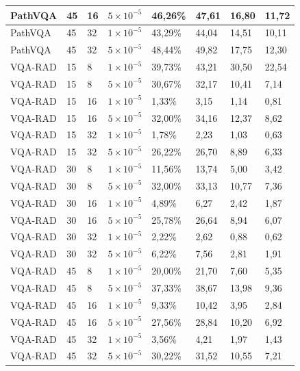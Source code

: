 \begin{longtable}[c]{|l|l|l|l|l|l|l|l|}
    PathVQA & 45 & 16 & $5 \times 10^{-5}$ & 46,26\% & 47,61 & 16,80 & 11,72 \\ \hline
    PathVQA & 45 & 32 & $1 \times 10^{-5}$ & 43,29\% & 44,04 & 14,51 & 10,11 \\ \hline
    PathVQA & 45 & 32 & $5 \times 10^{-5}$ & 48,44\% & 49,82 & 17,75 & 12,30 \\ \hline
    VQA-RAD & 15 & 8  & $1 \times 10^{-5}$ & 39,73\% & 43,21 & 30,50 & 22,54 \\ \hline
    VQA-RAD & 15 & 8  & $5 \times 10^{-5}$ & 30,67\% & 32,17 & 10,41 & 7,14  \\ \hline
    VQA-RAD & 15 & 16 & $1 \times 10^{-5}$ & 1,33\%  & 3,15  & 1,14  & 0,81  \\ \hline
    VQA-RAD & 15 & 16 & $5 \times 10^{-5}$ & 32,00\% & 34,16 & 12,37 & 8,62  \\ \hline
    VQA-RAD & 15 & 32 & $1 \times 10^{-5}$ & 1,78\%  & 2,23  & 1,03  & 0,63  \\ \hline
    VQA-RAD & 15 & 32 & $5 \times 10^{-5}$ & 26,22\% & 26,70 & 8,89  & 6,33  \\ \hline
    VQA-RAD & 30 & 8  & $1 \times 10^{-5}$ & 11,56\% & 13,74 & 5,00  & 3,42  \\ \hline
    VQA-RAD & 30 & 8  & $5 \times 10^{-5}$ & 32,00\% & 33,13 & 10,77 & 7,36  \\ \hline
    VQA-RAD & 30 & 16 & $1 \times 10^{-5}$ & 4,89\%  & 6,27  & 2,42  & 1,87  \\ \hline
    VQA-RAD & 30 & 16 & $5 \times 10^{-5}$ & 25,78\% & 26,64 & 8,94  & 6,07  \\ \hline
    VQA-RAD & 30 & 32 & $1 \times 10^{-5}$ & 2,22\%  & 2,62  & 0,88  & 0,62  \\ \hline
    VQA-RAD & 30 & 32 & $5 \times 10^{-5}$ & 6,22\%  & 7,56  & 2,81  & 1,91  \\ \hline
    VQA-RAD & 45 & 8  & $1 \times 10^{-5}$ & 20,00\% & 21,70 & 7,60  & 5,35  \\ \hline
    VQA-RAD & 45 & 8  & $5 \times 10^{-5}$ & 37,33\% & 38,67 & 13,98 & 9,36  \\ \hline
    VQA-RAD & 45 & 16 & $1 \times 10^{-5}$ & 9,33\%  & 10,42 & 3,95  & 2,84  \\ \hline
    VQA-RAD & 45 & 16 & $5 \times 10^{-5}$ & 27,56\% & 28,84 & 10,20 & 6,92  \\ \hline
    VQA-RAD & 45 & 32 & $1 \times 10^{-5}$ & 3,56\%  & 4,21  & 1,97  & 1,43  \\ \hline
    VQA-RAD & 45 & 32 & $5 \times 10^{-5}$ & 30,22\% & 31,52 & 10,55 & 7,21  \\ \hline
    
    \end{longtable}

